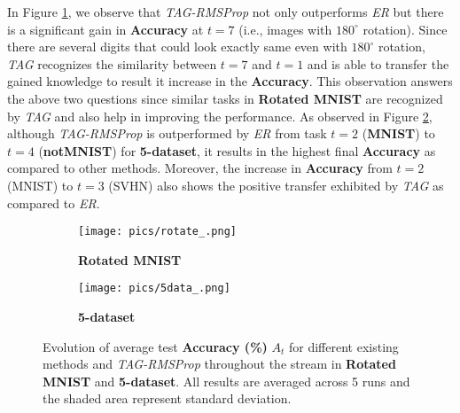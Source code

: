 \documentclass{article} \usepackage{collas2022_conference,times}
\begin{document}
In Figure \ref{sota_rotate_}, we observe that \textit{TAG-RMSProp} not only outperforms \textit{ER} but there is a significant gain in \textbf{Accuracy} at $t=7$ (i.e., images with $180 ^{\circ}$ rotation). Since there are several digits that could look exactly same even with $180 ^{\circ}$ rotation, \textit{TAG} recognizes the similarity between $t=7$ and $t=1$ and is able to transfer the gained knowledge to result it increase in the \textbf{Accuracy}. This observation answers the above two questions since similar tasks in \textbf{Rotated MNIST} are recognized by \textit{TAG} and also help in improving the performance. As observed in Figure \ref{sota_5data_}, although \textit{TAG-RMSProp} is outperformed by \textit{ER} from task $t=2$ (\textbf{MNIST}) to $t=4$ (\textbf{notMNIST}) for \textbf{5-dataset}, it results in the highest final \textbf{Accuracy} as compared to other methods. Moreover, the increase in \textbf{Accuracy} from $t=2$ (MNIST) to $t=3$ (SVHN) also shows the positive transfer exhibited by \textit{TAG} as compared to \textit{ER}.


\begin{figure}[h!]
            \centering
        \begin{subfigure}[b]{0.45\textwidth}
            \texttt{[image: pics/rotate\_.png]}
            \caption{\textbf{Rotated MNIST}}\label{sota_rotate_}
        \end{subfigure}
        \hfill
        \begin{subfigure}[b]{0.45\textwidth}
            \texttt{[image: pics/5data\_.png]}
            \caption{\textbf{5-dataset}}\label{sota_5data_}
        \end{subfigure}

\caption{Evolution of average test \textbf{Accuracy (\%)} $A_t$ for different existing methods and \textit{TAG-RMSProp} throughout the stream in \textbf{Rotated MNIST} and \textbf{5-dataset}. All results are averaged across 5 runs and the shaded area represent standard deviation.}
        \label{sota_5data}
    \end{figure}
\end{document}
